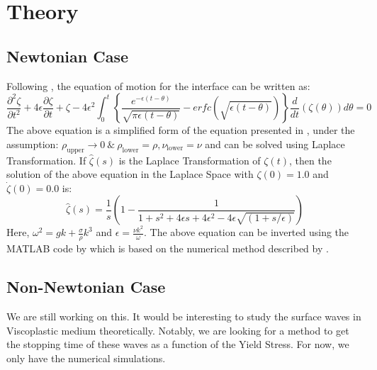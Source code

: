 \documentclass[]{article}
\begin{document}
\section{Theory}
\subsection{Newtonian Case}
Following \cite{prosperetti1976viscous}, the equation of motion for the interface can be written as:
\begin{equation}
\frac{\partial^2 \zeta}{\partial t^2} + 4\epsilon\frac{\partial \zeta}{\partial t} + \zeta - 4\epsilon^2\int_0^t\left\{\frac{e^{-\epsilon(t-\theta)}}{\sqrt{\pi\epsilon(t-\theta)}} - erfc\left(\sqrt{\epsilon(t-\theta)}\right)\right\}\frac{d}{dt}\left(\zeta(\theta)\right)d\theta = 0
\end{equation}
The above equation is a simplified form of the equation presented in \cite{prosperetti1981motion}, under the assumption: $\rho_{\mbox{upper}} \to 0\:\&\:\rho_{\mbox{lower}} = \rho, \nu_{\mbox{lower}} = \nu$ and can be solved using Laplace Transformation. If $\hat{\zeta}(s)$ is the Laplace Transformation of $\zeta(t)$, then the solution of the above equation in the Laplace Space with $\zeta(0) = 1.0$ and $\dot{\zeta}(0) = 0.0$ is:
\begin{equation}
\hat{\zeta}(s) = \frac{1}{s}\left(1 - \frac{1}{1 + s^2 + 4\epsilon s + 4\epsilon^2 - 4\epsilon\sqrt{\left(1+s/\epsilon\right)}}\right)
\end{equation}
Here, $\omega^2 = gk + \frac{\sigma}{\rho}k^3$ and $\epsilon = \frac{\nu k^2}{\omega}$. The above equation can be inverted using the MATLAB code by \cite{MATLAB} which is based on the numerical method described by \cite{abate2006unified}.
\subsection{Non-Newtonian Case}
We are still working on this. It would be interesting to study the surface waves in Viscoplastic medium theoretically. Notably, we are looking for a method to get the stopping time of these waves as a function of the Yield Stress. For now, we only have the numerical simulations.
\printbibliography
\end{document}
